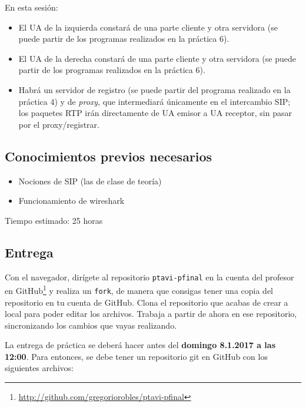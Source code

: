 \documentclass[a4paper,11pt]{article}
\begin{document}
En esta sesión:

\begin{itemize}
  \item El UA de la izquierda constará de una parte cliente y otra servidora (se puede partir de los programas realizados en la práctica 6).
  \item El UA de la derecha constará de una parte cliente y otra servidora (se puede partir de los programas realizados en la práctica 6).
  \item Habrá un servidor de registro (se puede partir del programa realizado en la práctica 4) y de \emph{proxy}, que intermediará únicamente en el intercambio SIP; los paquetes RTP irán directamente de UA emisor a UA receptor, sin pasar por el proxy/registrar.
\end{itemize}


\subsection{Conocimientos previos necesarios}

\begin{itemize}
  \item Nociones de SIP (las de clase de teoría)
  \item Funcionamiento de wireshark
\end{itemize}

Tiempo estimado: 25 horas


\subsection{Entrega}

Con el navegador, dirígete al repositorio \texttt{ptavi-pfinal} en la cuenta del profesor en GitHub\footnote{\url{http://github.com/gregoriorobles/ptavi-pfinal}} y realiza un \texttt{fork}, de manera que consigas tener una copia del repositorio en tu cuenta de GitHub. Clona el repositorio que acabas de crear a local para poder editar los archivos. Trabaja a partir de ahora en ese repositorio, sincronizando los cambios que vayas realizando.

La entrega de práctica se deberá hacer antes del {\bf domingo 8.1.2017 a las 12:00}. Para entonces, se debe tener un repositorio git en GitHub con los siguientes archivos:
\end{document}
